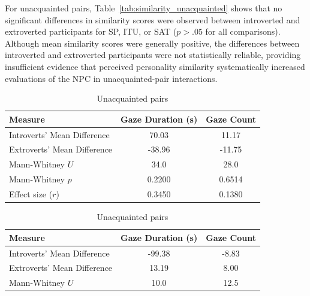 \documentclass[a4paper,fleqn]{cas-sc}
\begin{document}
For unacquainted pairs, Table~\ref{tab:similarity_unacquainted} shows that no significant differences in similarity scores were observed between introverted and extroverted participants for SP, ITU, or SAT ($p>.05$ for all comparisons). Although mean similarity scores were generally positive, the differences between introverted and extroverted participants were not statistically reliable, providing insufficient evidence that perceived personality similarity systematically increased evaluations of the NPC in unacquainted-pair interactions.

\begin{table}[t]
\centering
\caption{Similarity-attraction analysis of gaze behavior by pair acquaintance.}
\label{tab:similarity_gaze}

\begin{subtable}[t]{\textwidth}
\centering
\caption{Acquainted pairs}
\label{tab:gaze_similarity_acquainted}
\begin{tabular}{lcc}
\toprule
\textbf{Measure} & \textbf{Gaze Duration (s)} & \textbf{Gaze Count} \\
\midrule
Introverts' Mean Difference
& 70.03 & 11.17 \\

Extroverts' Mean Difference
& -38.96 & -11.75 \\
\midrule
Mann-Whitney $U$
& 34.0 & 28.0 \\

Mann-Whitney $p$
& 0.2200 & 0.6514 \\

Effect size ($r$)
& 0.3450 & 0.1380 \\
\bottomrule
\end{tabular}
\end{subtable}

\vspace{4mm}

\begin{subtable}[t]{\textwidth}
\centering
\caption{Unacquainted pairs}
\label{tab:gaze_similarity_unacquainted}
\begin{tabular}{lcc}
\toprule
\textbf{Measure} & \textbf{Gaze Duration (s)} & \textbf{Gaze Count} \\
\midrule
Introverts' Mean Difference
& -99.38 & -8.83 \\

Extroverts' Mean Difference
& 13.19 & 8.00 \\
\midrule
Mann-Whitney $U$
& 10.0 & 12.5 \\


\end{tabular}
\end{subtable}
\end{table}
\end{document}
